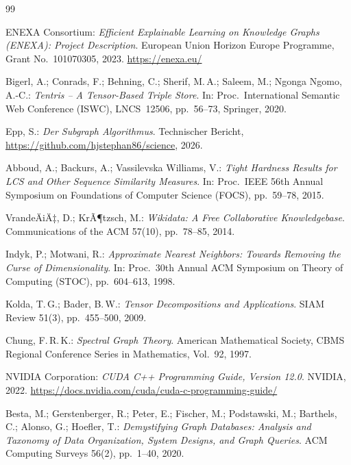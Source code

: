 ﻿\documentclass[a4paper,12pt]{article}
\theoremstyle{definition}
\begin{document}
\begin{thebibliography}{99}

ENEXA Consortium: \textit{Efficient Explainable Learning on Knowledge Graphs (ENEXA):
Project Description}. European Union Horizon Europe Programme, Grant No.\ 101070305, 2023.
\url{https://enexa.eu/}

Bigerl, A.; Conrads, F.; Behning, C.; Sherif, M.\,A.; Saleem, M.; Ngonga Ngomo, A.-C.:
\textit{Tentris -- A Tensor-Based Triple Store}. In: Proc.\ International Semantic Web
Conference (ISWC), LNCS~12506, pp.\ 56--73, Springer, 2020.

Epp, S.: \textit{Der Subgraph Algorithmus}. Technischer Bericht,
\url{https://github.com/hjstephan86/science}, 2026.

Abboud, A.; Backurs, A.; Vassilevska Williams, V.:
\textit{Tight Hardness Results for LCS and Other Sequence Similarity Measures}.
In: Proc.\ IEEE 56th Annual Symposium on Foundations of Computer Science (FOCS),
pp.\ 59--78, 2015.

VrandeÄiÄ‡, D.; KrÃ¶tzsch, M.:
\textit{Wikidata: A Free Collaborative Knowledgebase}.
Communications of the ACM 57(10), pp.\ 78--85, 2014.

Indyk, P.; Motwani, R.:
\textit{Approximate Nearest Neighbors: Towards Removing the Curse of Dimensionality}.
In: Proc.\ 30th Annual ACM Symposium on Theory of Computing (STOC),
pp.\ 604--613, 1998.

Kolda, T.\,G.; Bader, B.\,W.:
\textit{Tensor Decompositions and Applications}.
SIAM Review 51(3), pp.\ 455--500, 2009.

Chung, F.\,R.\,K.:
\textit{Spectral Graph Theory}.
American Mathematical Society, CBMS Regional Conference Series in Mathematics, Vol.\ 92, 1997.

NVIDIA Corporation:
\textit{CUDA C++ Programming Guide, Version 12.0}. NVIDIA, 2022.
\url{https://docs.nvidia.com/cuda/cuda-c-programming-guide/}

Besta, M.; Gerstenberger, R.; Peter, E.; Fischer, M.; Podstawski, M.; Barthels, C.;
Alonso, G.; Hoefler, T.:
\textit{Demystifying Graph Databases: Analysis and Taxonomy of Data Organization,
System Designs, and Graph Queries}.
ACM Computing Surveys 56(2), pp.\ 1--40, 2020.


\end{thebibliography}
\end{document}
